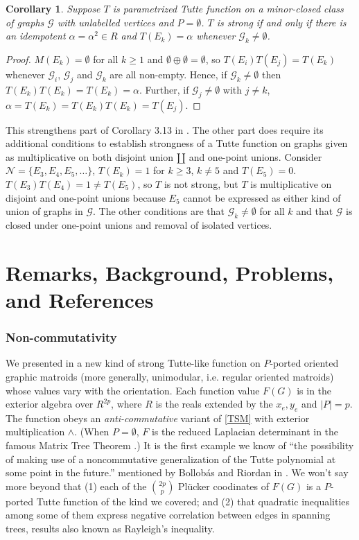 \documentclass[12pt,leqno]{amsart}
\newtheorem{cor}[lem]{Corollary}
\theoremstyle{remark}
\begin{document}
\begin{cor}
Suppose $T$ is parametrized Tutte function on a minor-closed class
of graphs $\mathcal{G}$ with unlabelled vertices
and $P=\emptyset$.
$T$ is strong if and only if 
there is an idempotent $\alpha=\alpha^2\in R$ and $T(E_k)=\alpha$
whenever $\mathcal{G}_k\neq\emptyset$.
\end{cor}


\begin{proof}
$M(E_k)=\emptyset$ for all $k\geq 1$ and 
$\emptyset\oplus\emptyset=\emptyset$, so 
$T(E_i)T(E_j)=T(E_k)$ whenever $\mathcal{G}_i$,
$\mathcal{G}_j$ and 
$\mathcal{G}_k$ are all non-empty.  Hence, if
$\mathcal{G}_k\neq\emptyset$ then $T(E_k)T(E_k)=T(E_k)=\alpha$.
Further, if $\mathcal{G}_j\neq\emptyset$ with $j\neq k$,
$\alpha=T(E_k)=T(E_k)T(E_k)=T(E_j)$.
\end{proof}

This
strengthens part of Corollary 3.13 in \cite{Ellis-Monaghan-Traldi}.
The other part does require its 
additional conditions to establish strongness of 
a Tutte function on graphs given as multiplicative on
both disjoint union $\amalg$ and one-point unions.
Consider $\mathcal{N}=\{E_3, E_4, E_5,  \ldots \}$,
$T(E_k)=1$ for $k\geq 3$, $k\neq 5$ and 
$T(E_5)=0$.  $T(E_3)T(E_4)=1\neq T(E_5)$, so 
$T$ is not strong, but $T$ is multiplicative
on disjoint and one-point unions because $E_5$ cannot be expressed
as either kind of union of graphs in $\mathcal{G}$.  The other conditions
are that $\mathcal{G}_k\neq\emptyset$ for all $k$ and that 
$\mathcal{G}$ is closed under one-point unions and removal of isolated
vertices.

\part{Remarks, Background, Problems, and References}

\section{Non-commutativity}
We presented in  \cite{TutteEx}
a new kind of strong Tutte-like function on $P$-ported oriented graphic
matroids (more generally, unimodular, i.e. regular oriented matroids)
whose values vary with the orientation.   
Each function value $F(G)$ is
in the exterior algebra over $R^{2p}$, where $R$ is
the reals extended by the $x_e, y_e$ 
and $|P|=p$.  The function
obeys an \emph{anti-commutative} variant of \eqref{TSM}
with exterior multiplication $\wedge$.  
(When $P=\emptyset$, $F$ is
the reduced Laplacian determinant in the
famous Matrix Tree Theorem \cite{HararyBook,sdcMTT}.)  
It is the first example we know
of
``the possibility of making use of a noncommutative generalization of the Tutte
polynomial at some point in the future.'' mentioned by Bollob\'{a}s and
Riordan in \cite{BollobasRiordanTuttePolyColored}.  We won't say
more beyond that (1) each of the $\binom{2p}{p}$
Pl\"{u}cker coodinates of $F(G)$ is a $P$-ported Tutte function
of the kind we covered; and (2) that quadratic inequalities among
some of them express negative correlation between edges in spanning trees,
results also known as 
Rayleigh's inequality\cite{ChoeRayleigh,SempleWelshNegCorr08,HalfPlaneStuff}.
\end{document}
